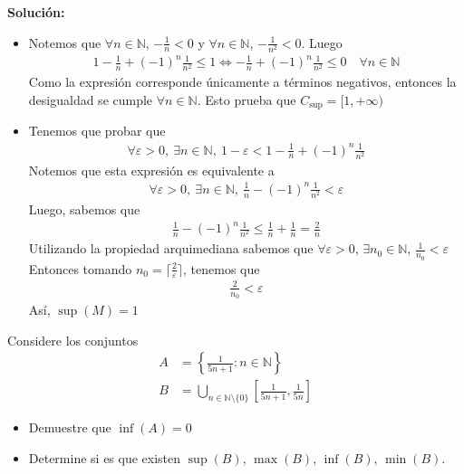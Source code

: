 \documentclass[12pt]{book}
\begin{document}
\textbf{Solución:}
\begin{itemize}
    \item[\textbf{a)}] Notemos que $\forall n \in \mathbb{N}$, $-\frac{1}{n} < 0$ y  $\forall n \in \mathbb{N}$, $-\frac{1}{n^2} < 0$. Luego
    \begin{align*}
       1-\frac{1}{n}+(-1)^n\frac{1}{n^2} \leq 1 \Longleftrightarrow -\frac{1}{n}+(-1)^n\frac{1}{n^2} \leq 0 \quad \forall n \in \mathbb{N}
    \end{align*}
    Como la expresión corresponde únicamente a términos negativos, entonces la desigualdad se cumple $\forall n \in \mathbb{N}$. Esto prueba que $C_{\sup}=[1, +\infty)$
    \item[\textbf{b)}] Tenemos que probar que 
    \begin{align*}
        \forall \varepsilon>0, \ \exists n\in \mathbb{N}, \ 1-\varepsilon< 1- \frac{1}{n}+(-1)^n \frac{1}{n^2}
    \end{align*}
    Notemos que esta expresión es equivalente a 
    \begin{align*}
     \forall \varepsilon>0, \ \exists n\in \mathbb{N}, \   \frac{1}{n}-(-1)^n \frac{1}{n^2}<\varepsilon
    \end{align*}
    Luego, sabemos que 
    \begin{align*}
         \frac{1}{n}-(-1)^n \frac{1}{n^2} \leq \frac{1}{n}+\frac{1}{n} =\frac{2}{n}
    \end{align*}
    Utilizando la propiedad arquimediana sabemos que $\forall \varepsilon>0$, $\exists n_0 \in \mathbb{N}$, $ \displaystyle\frac{1}{n_0}< \varepsilon$
    Entonces tomando $n_0=\lceil \frac{2}{\varepsilon}\rceil$, tenemos que
    \begin{align*}
        \frac{2}{n_0} <\varepsilon
    \end{align*}
Así, $\sup(M)=1$
\end{itemize}
\begin{prob}{}{}
    Considere los conjuntos 
    \begin{align*}
        A&=\left\{ \frac{1}{5n+1} : n \in \mathbb{N}\right\} \\
        B&= \bigcup_{n \in \mathbb{N}\setminus \{0\}} \left[\frac{1}{5n+1}, \frac{1}{5n} \right]
    \end{align*}
    \begin{itemize}
        \item[\textbf{a)}] Demuestre que $\inf(A)=0$
        \item[\textbf{b)}] Determine si es que existen $\sup(B)$, $\max(B)$, $\inf(B)$, $\min(B)$.
    \end{itemize}
\end{prob}
\end{document}
